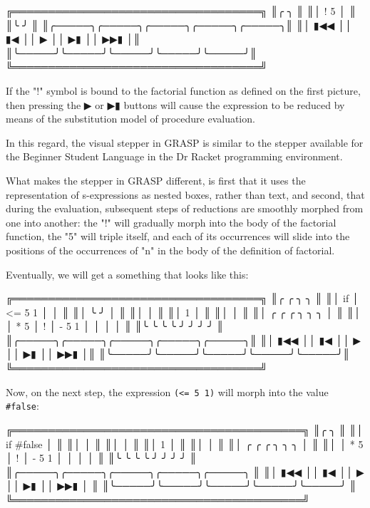 \documentclass[acmsmall]{acmart}
\newenvironment{Snippet}{\Verbatim[samepage=true]}{\endVerbatim}
\begin{document}
\begin{Snippet}
╔═══════════════════════════════════╗
║╭     ╮                            ║
║│ ! 5 │                            ║
║╰     ╯                            ║
║╭─────╮╭─────╮╭─────╮╭─────╮╭─────╮║
║│ ▮◀◀ ││ ▮◀  ││  ▶  ││  ▶▮ ││ ▶▶▮ │║
║╰─────╯╰─────╯╰─────╯╰─────╯╰─────╯║
╚═══════════════════════════════════╝
\end{Snippet}

If the "!" symbol is bound to the factorial function as defined on the
first picture, then pressing the ▶ or ▶▮ buttons will cause the
expression to be reduced by means of the substitution model of
procedure evaluation\cite{SICP}.

In this regard, the visual stepper in GRASP is similar to the stepper
available for the Beginner Student Language in the Dr Racket
programming environment\cite{Clements}.

What makes the stepper in GRASP different, is first that it uses the
representation of s-expressions as nested boxes, rather than text, and
second, that during the evaluation, subsequent steps of reductions are
smoothly morphed from one into another: the "!" will gradually morph
into the body of the factorial function, the "5" will triple itself,
and each of its occurrences will slide into the positions of the
occurrences of "n" in the body of the definition of factorial.

Eventually, we will get a something that looks like this:

\begin{Snippet}
╔═══════════════════════════════════╗
║╭    ╭        ╮                 ╮  ║
║│ if │ <= 5 1 │                 │  ║
║│    ╰        ╯                 │  ║
║│                               │  ║
║│       1                       │  ║
║│                               │  ║
║│       ╭     ╭   ╭       ╮ ╮ ╮ │  ║
║│       │ * 5 │ ! │ - 5 1 │ │ │ │  ║
║╰       ╰     ╰   ╰       ╯ ╯ ╯ ╯  ║
║╭─────╮╭─────╮╭─────╮╭─────╮╭─────╮║
║│ ▮◀◀ ││ ▮◀  ││  ▶  ││  ▶▮ ││ ▶▶▮ │║
║╰─────╯╰─────╯╰─────╯╰─────╯╰─────╯║
╚═══════════════════════════════════╝
\end{Snippet}

Now, on the next step, the expression \texttt{(<= 5 1)} will morph into the
value \texttt{\#false}:

\begin{Snippet}
╔═════════════════════════════════════════╗
║╭                               ╮        ║
║│ if #false                     │        ║
║│                               │        ║
║│                               │        ║
║│       1                       │        ║
║│                               │        ║
║│       ╭     ╭   ╭       ╮ ╮ ╮ │        ║
║│       │ * 5 │ ! │ - 5 1 │ │ │ │        ║
║╰       ╰     ╰   ╰       ╯ ╯ ╯ ╯        ║
║╭─────╮╭─────╮╭─────╮╭─────╮╭─────╮      ║
║│ ▮◀◀ ││ ▮◀  ││  ▶  ││  ▶▮ ││ ▶▶▮ │      ║
║╰─────╯╰─────╯╰─────╯╰─────╯╰─────╯      ║
╚═════════════════════════════════════════╝
\end{Snippet}
\end{document}
